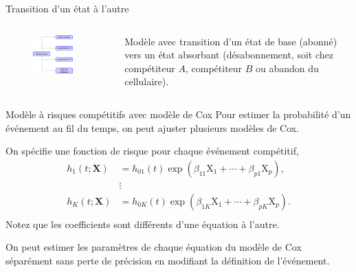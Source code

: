 \documentclass[
  ignorenonframetext,
]{beamer}
\begin{document}
\begin{frame}{Transition d'un état à l'autre}
\protect\hypertarget{transition-dun-uxe9tat-uxe0-lautre}{}
\begin{columns}[T]
\begin{column}{0.6\textwidth}
\begin{figure}

{\centering \includegraphics[width=0.8\textwidth,height=\textheight]{figures/transition_etats_modele_risque_competitifs.pdf}

}

\end{figure}
\end{column}

\begin{column}{0.4\textwidth}
Modèle avec transition d'un état de base (abonné) vers un état absorbant
(désabonnement, soit chez compétiteur \(A\), compétiteur \(B\) ou
abandon du cellulaire).
\end{column}
\end{columns}
\end{frame}

\begin{frame}{Modèle à risques compétitifs avec modèle de Cox}
\protect\hypertarget{moduxe8le-uxe0-risques-compuxe9titifs-avec-moduxe8le-de-cox}{}
Pour estimer la probabilité d'un événement au fil du temps, on peut
ajuster plusieurs modèles de Cox.

On spécifie une fonction de risque pour chaque événement compétitif,
\begin{align*}
h_1(t; \mathbf{X})&= h_{01}(t) \exp(\beta_{11}\mathrm{X}_1 + \cdots + \beta_{p1} \mathrm{X}_p),\\
&\vdots\\
h_K(t; \mathbf{X})&= h_{0K}(t) \exp(\beta_{1K}\mathrm{X}_1 + \cdots + \beta_{pK} \mathrm{X}_p).\\
\end{align*} Notez que les coefficients sont différents d'une équation à
l'autre.

On peut estimer les paramètres de chaque équation du modèle de Cox
séparément sans perte de précision en modifiant la définition de
l'événement.
\end{frame}
\end{document}
